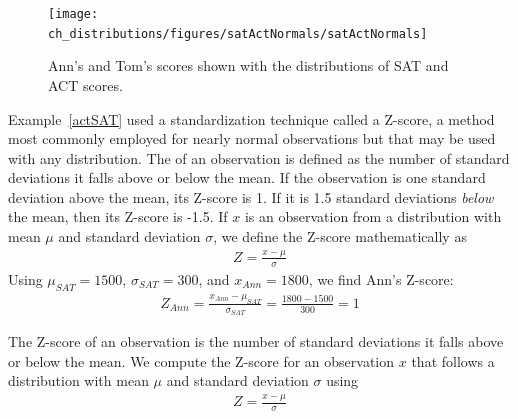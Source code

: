 \begin{figure}
\centering
\texttt{[image: ch\_distributions/figures/satActNormals/satActNormals]}
\caption{Ann's and Tom's scores shown with the distributions of SAT and ACT scores.}
\label{satActNormals}
\end{figure}

Example~\ref{actSAT} used a standardization technique called a Z-score, a method most commonly employed for nearly normal observations but that may be used with any distribution. The  of an observation is defined as the number of standard deviations it falls above or below the mean. If the observation is one standard deviation above the mean, its Z-score is 1. If it is 1.5 standard deviations \emph{below} the mean, then its Z-score is -1.5. If $x$ is an observation from a distribution with mean $\mu$ and standard deviation $\sigma$, we define the Z-score mathematically as
\begin{eqnarray*}
Z = \frac{x-\mu}{\sigma}
\end{eqnarray*}
Using $\mu_{SAT}=1500$, $\sigma_{SAT}=300$, and $x_{Ann}=1800$, we find Ann's Z-score:
\begin{eqnarray*}
Z_{Ann} = \frac{x_{Ann} - \mu_{SAT}}{\sigma_{SAT}} = \frac{1800-1500}{300} = 1
\end{eqnarray*}

\begin{termBox}{
The Z-score of an observation is the number of standard deviations it falls above or below the mean. We compute the Z-score for an observation $x$ that follows a distribution with mean $\mu$ and standard deviation $\sigma$ using
\begin{eqnarray*}
Z = \frac{x-\mu}{\sigma}
\end{eqnarray*}}
\end{termBox}

